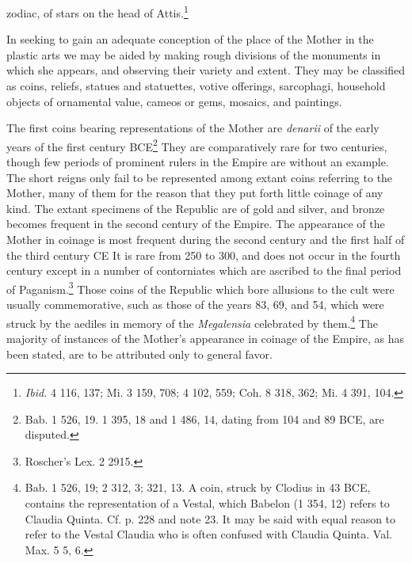 \documentclass[a4paper, 11pt, oneside, polutonikogreek, english]{article}
\begin{document}
zodiac, of stars on the head of Attis.\footnote{\emph{Ibid.} 4 116, 137; Mi. 3 159, 708; 4 102, 559; Coh. 8 318, 362; Mi. 4 391, 104.}

In seeking to gain an adequate conception of the place of the Mother in the plastic arts we may be aided by making rough divisions of the monuments in which she appears, and observing their variety and extent. They may be classified as coins, reliefs, statues and statuettes, votive offerings, sarcophagi, household objects of ornamental value, cameos or gems, mosaics, and paintings.

The first coins bearing representations of the Mother are \emph{denarii} of the early years of the first century \textsc{BCE}\footnote{Bab. 1 526, 19. 1 395, 18 and 1 486, 14, dating from 104 and 89 \textsc{BCE}, are disputed.} They are comparatively rare for two centuries, though few periods of prominent rulers in the Empire are without an example. The short reigns only fail to be represented among extant coins referring to the Mother, many of them for the reason that they put forth little coinage of any kind. The extant specimens of the Republic are of gold and silver, and bronze becomes frequent in the second century of the Empire. The appearance of the Mother in coinage is most frequent during the second century and the first half of the third century \textsc{CE} It is rare from 250 to 300, and does not occur in the fourth century except in a number of contorniates which are ascribed to the final period of Paganism.\footnote{Roscher's Lex. 2 2915.} Those coins of the Republic which bore allusions to the cult were usually commemorative, such as those of the years 83, 69, and 54, which were struck by the aediles in memory of the \emph{Megalensia} celebrated by them.\footnote{Bab. 1 526, 19; 2 312, 3; 321, 13. A coin, struck by Clodius in 43 \textsc{BCE}, contains the representation of a Vestal, which Babelon (1 354, 12) refers to Claudia Quinta. Cf. p. 228 and note 23. It may be said with equal reason to refer to the Vestal Claudia who is often confused with Claudia Quinta. Val. Max. 5 5, 6.} The majority of instances of the Mother's appearance in coinage of the Empire, as has been stated, are to be attributed only to general favor.
\end{document}
